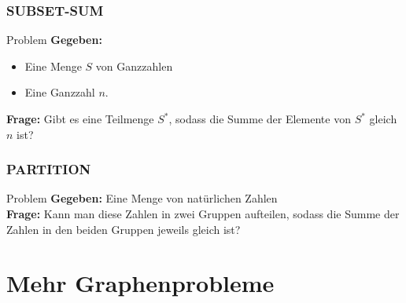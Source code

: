 \begin{frame}
\frametitle{SUBSET-SUM}
\begin{block}{Problem}
\textbf{Gegeben:}
\begin{itemize}
 \item Eine Menge $S$ von Ganzzahlen
 \item Eine Ganzzahl $n$.
\end{itemize}
\textbf{Frage:}
Gibt es eine Teilmenge $S^*$, sodass die Summe der Elemente von $S^*$ gleich $n$ ist?
\end{block}
\end{frame}
\begin{frame}
\frametitle{PARTITION}
\begin{block}{Problem}
\textbf{Gegeben:} Eine Menge von natürlichen Zahlen\\
\textbf{Frage:} Kann man diese Zahlen in zwei Gruppen aufteilen, sodass die Summe der Zahlen in den beiden Gruppen jeweils gleich ist?
\end{block}
\end{frame}


\section{Mehr Graphenprobleme}
\subsection{}


